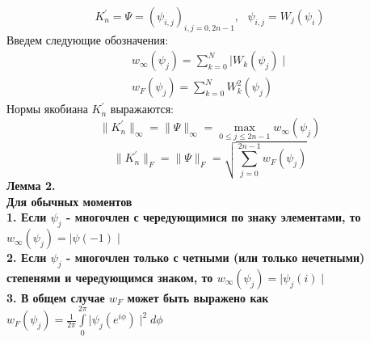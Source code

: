 \begin{equation}
K^{'}_n=\Psi=(\psi_{i,j})_{i,j=0,2n-1},\mbox{   } \psi_{i,j}=W_j(\psi_i)
\end{equation}
Введем следующие обозначения:
\begin{eqnarray}
w_{\infty}(\psi_j)=\sum\limits_{k=0}^{N} {\mid W_k(\psi_j) \mid} \nonumber \\
w_{F}(\psi_j)=\sum\limits_{k=0}^{N} {W_k^2(\psi_j)} \nonumber
\end{eqnarray}
Нормы якобиана $K^{'}_n$ выражаются:
\begin{equation}
\parallel K^{'}_n \parallel _{\infty}=\parallel \Psi  \parallel _{\infty}=
\max\limits_{0\leq j \leq 2n-1} w_{\infty}(\psi_j)
\end{equation}
\begin{equation}
\parallel K^{'}_n \parallel _{F}=\parallel \Psi  \parallel _{F}=
\sqrt{ \sum\limits_{j=0}^{2n-1}{w_F(\psi_j)} }
\end{equation}
\bf Лемма 2. \rm \\
Для обычных моментов \\
1. Если $\psi_j$ - многочлен с чередующимися по знаку элементами,
то $ w_{\infty}(\psi_j)=\mid \psi(-1) \mid$ \\
2. Если $\psi_j$ - многочлен только с четными (или только нечетными)
степенями и чередующимся знаком, то $ w_{\infty}(\psi_j)=\mid \psi_j(i) \mid$ \\
3. В общем случае $w_F$ может быть выражено как $w_F(\psi_j)=\frac{1}{2\pi}\int\limits_{0}^{2\pi}{\mid \psi_j(e^{i\phi}) \mid ^{2}d\phi}$


